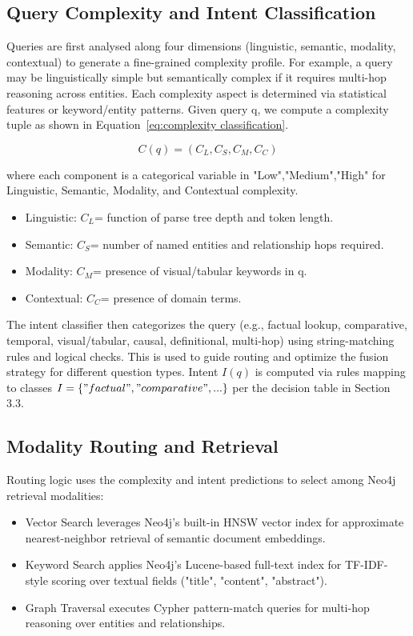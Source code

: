 \documentclass[11pt]{article}
\begin{document}
\subsection{Query Complexity and Intent Classification}

Queries are first analysed along four dimensions (linguistic, semantic, modality, contextual) to generate a fine-grained complexity profile. For example, a query may be linguistically simple but semantically complex if it requires multi-hop reasoning across entities. Each complexity aspect is determined via statistical features or keyword/entity patterns. Given query q, we compute a complexity tuple as shown in Equation~\ref{eq:complexity classification}.

\begin{equation}
    \label{eq:complexity classification}
    C(q)=(C_L,C_S,C_M,C_C)
\end{equation}

where each component is a categorical variable in {"Low","Medium","High"} for Linguistic, Semantic, Modality, and Contextual complexity.
\begin{itemize}
    \item Linguistic: \(C_L\)= function of parse tree depth and token length.
    \item Semantic: \(C_S\)= number of named entities and relationship hops required.
    \item Modality: \(C_M\)= presence of visual/tabular keywords in q.
    \item Contextual: \(C_C\)= presence of domain terms.
\end{itemize}

The intent classifier then categorizes the query (e.g., factual lookup, comparative, temporal, visual/tabular, causal, definitional, multi-hop) using string-matching rules and logical checks. This is used to guide routing and optimize the fusion strategy for different question types. Intent \(I(q)\) is computed via rules mapping to classes \(I=\{"factual","comparative",...\}\) per the decision table in Section 3.3.

\subsection{Modality Routing and Retrieval}

Routing logic uses the complexity and intent predictions to select among Neo4j retrieval modalities:
\begin{itemize}
    \item Vector Search leverages Neo4j's built-in HNSW vector index for approximate nearest-neighbor retrieval of semantic document embeddings.
    \item Keyword Search applies Neo4j’s Lucene-based full-text index for TF-IDF-style scoring over textual fields ("title", "content", "abstract").
    \item Graph Traversal executes Cypher pattern-match queries for multi-hop reasoning over entities and relationships.
\end{itemize}
\end{document}
